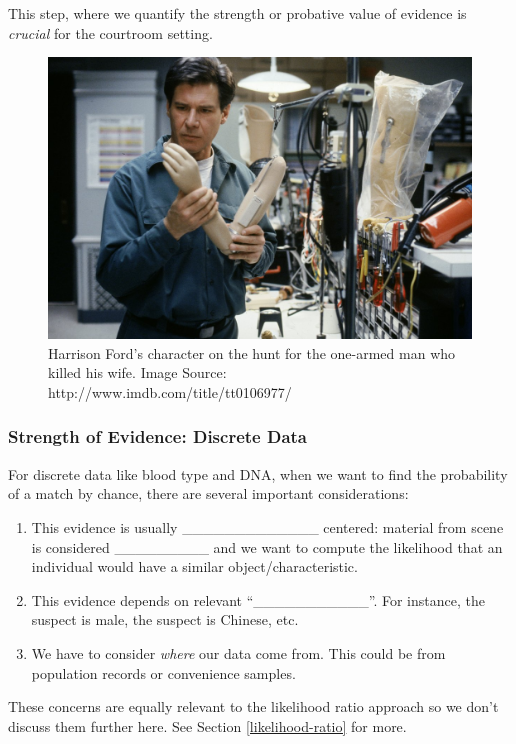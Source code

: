 \documentclass[]{book}
\providecommand{\tightlist}{%
  \setlength{\itemsep}{0pt}\setlength{\parskip}{0pt}}
\theoremstyle{definition}
\theoremstyle{definition}
\theoremstyle{remark}
\begin{document}
This step, where we quantify the strength or probative value of evidence
is \emph{crucial} for the courtroom setting.

\begin{figure}[h]

{\centering \includegraphics[width=.5\linewidth]{img/thefugitive} 

}

\caption{Harrison Ford's character on the hunt for the one-armed man who killed his wife. Image Source: http://www.imdb.com/title/tt0106977/}\label{fig:fugitive}
\end{figure}

\subsubsection{Strength of Evidence: Discrete
Data}\label{strength-of-evidence-discrete-data}

For discrete data like blood type and DNA, when we want to find the
probability of a match by chance, there are several important
considerations:

\begin{enumerate}
\def\labelenumi{\arabic{enumi}.}
\tightlist
\item
  This evidence is usually \_\_\_\_\_\_\_\_\_\_\_\_\_ centered: material
  from scene is considered \_\_\_\_\_\_\_\_\_ and we want to compute the
  likelihood that an individual would have a similar
  object/characteristic. \vspace{.1in}
\item
  This evidence depends on relevant ``\_\_\_\_\_\_\_\_\_\_\_''. For
  instance, the suspect is male, the suspect is Chinese, etc.
  \vspace{.1in}
\item
  We have to consider \emph{where} our data come from. This could be
  from population records or convenience samples.
\end{enumerate}

These concerns are equally relevant to the likelihood ratio approach so
we don't discuss them further here. See Section \ref{likelihood-ratio}
for more.
\end{document}
